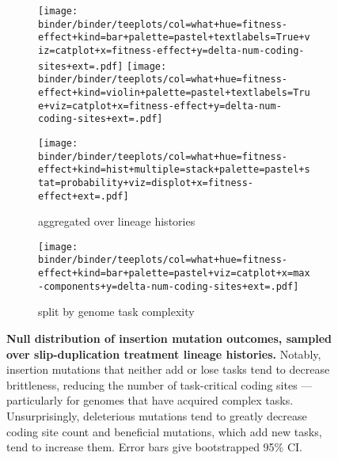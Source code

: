 \begin{figure*}
    \centering
    \begin{subfigure}{\textwidth}
    \texttt{[image: binder/binder/teeplots/col=what+hue=fitness-effect+kind=bar+palette=pastel+textlabels=True+viz=catplot+x=fitness-effect+y=delta-num-coding-sites+ext=.pdf]}%
    \texttt{[image: binder/binder/teeplots/col=what+hue=fitness-effect+kind=violin+palette=pastel+textlabels=True+viz=catplot+x=fitness-effect+y=delta-num-coding-sites+ext=.pdf]}

    \texttt{[image: binder/binder/teeplots/col=what+hue=fitness-effect+kind=hist+multiple=stack+palette=pastel+stat=probability+viz=displot+x=fitness-effect+ext=.pdf]}

    \caption{\footnotesize aggregated over lineage histories}
    \end{subfigure}

    \begin{subfigure}{\textwidth}
    \centering
\texttt{[image: binder/binder/teeplots/col=what+hue=fitness-effect+kind=bar+palette=pastel+viz=catplot+x=max-components+y=delta-num-coding-sites+ext=.pdf]}
    \caption{\footnotesize split by genome task complexity}
    \end{subfigure}
    \caption{
        \textbf{Null distribution of insertion mutation outcomes, sampled over slip-duplication treatment lineage histories.}
        \footnotesize
        Notably, insertion mutations that neither add or lose tasks tend to decrease brittleness, reducing the number of task-critical coding sites --- particularly for genomes that have acquired complex tasks.
        Unsurprisingly, deleterious mutations tend to greatly decrease coding site count and beneficial mutations, which add new tasks, tend to increase them.
        Error bars give bootstrapped 95\% CI.
    }
    \label{fig:nulldist}
\end{figure*}
